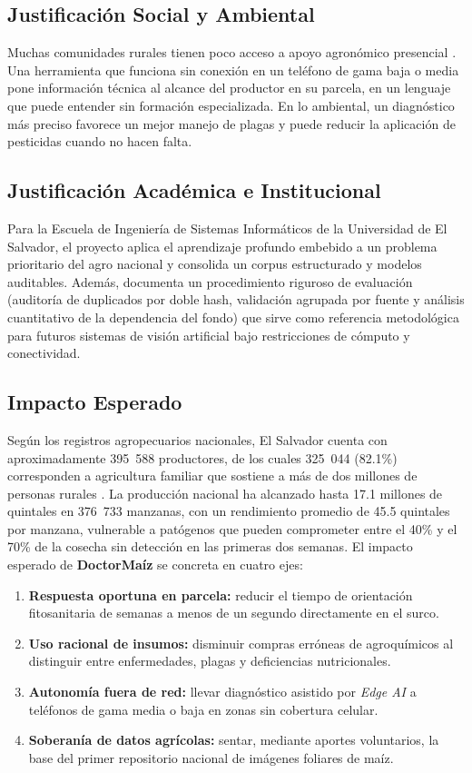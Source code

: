 \subsection{Justificaci\'on Social y Ambiental}
Muchas comunidades rurales tienen poco acceso a apoyo agron\'omico presencial \cite{centa2022}. Una herramienta que funciona sin conexi\'on en un tel\'efono de gama baja o media pone informaci\'on t\'ecnica al alcance del productor en su parcela, en un lenguaje que puede entender sin formaci\'on especializada. En lo ambiental, un diagn\'ostico m\'as preciso favorece un mejor manejo de plagas y puede reducir la aplicaci\'on de pesticidas cuando no hacen falta.

\subsection{Justificaci\'on Acad\'emica e Institucional}
Para la Escuela de Ingenier\'ia de Sistemas Inform\'aticos de la Universidad de El Salvador, el proyecto aplica el aprendizaje profundo embebido a un problema prioritario del agro nacional y consolida un corpus estructurado y modelos auditables. Adem\'as, documenta un procedimiento riguroso de evaluaci\'on (auditor\'ia de duplicados por doble hash, validaci\'on agrupada por fuente y an\'alisis cuantitativo de la dependencia del fondo) que sirve como referencia metodol\'ogica para futuros sistemas de visi\'on artificial bajo restricciones de c\'omputo y conectividad.

\subsection{Impacto Esperado}
Seg\'un los registros agropecuarios nacionales, El Salvador cuenta con aproximadamente 395~588 productores, de los cuales 325~044 (82.1\%) corresponden a agricultura familiar que sostiene a m\'as de dos millones de personas rurales \cite{mag2023}. La producci\'on nacional ha alcanzado hasta 17.1 millones de quintales en 376~733 manzanas, con un rendimiento promedio de 45.5 quintales por manzana, vulnerable a pat\'ogenos que pueden comprometer entre el 40\% y el 70\% de la cosecha sin detecci\'on en las primeras dos semanas. El impacto esperado de \textbf{DoctorMa\'iz} se concreta en cuatro ejes:
\begin{enumerate}
\item \textbf{Respuesta oportuna en parcela:} reducir el tiempo de orientaci\'on fitosanitaria de semanas a menos de un segundo directamente en el surco.
\item \textbf{Uso racional de insumos:} disminuir compras err\'oneas de agroqu\'imicos al distinguir entre enfermedades, plagas y deficiencias nutricionales.
\item \textbf{Autonom\'ia fuera de red:} llevar diagn\'ostico asistido por \textit{Edge AI} a tel\'efonos de gama media o baja en zonas sin cobertura celular.
\item \textbf{Soberan\'ia de datos agr\'icolas:} sentar, mediante aportes voluntarios, la base del primer repositorio nacional de im\'agenes foliares de ma\'iz.
\end{enumerate}

